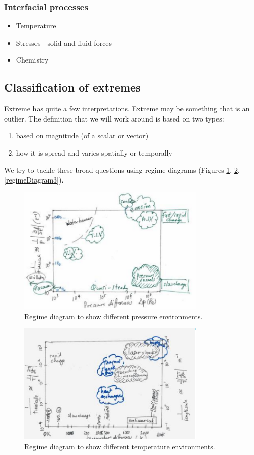 \subsubsection{Interfacial processes}
\begin{itemize}
    \item Temperature
    \item Stresses - solid and fluid forces
    \item Chemistry
\end{itemize}
\subsection{Classification of extremes}
Extreme has quite a few interpretations. Extreme may be something that is an outlier. The definition that we will work around is based on two types:
\begin{enumerate}
    \item based on magnitude (of a scalar or vector)
    \item how it is spread and varies spatially or temporally
\end{enumerate}
We try to tackle these broad questions using regime diagrams (Figures \ref{regimeDiagram1}, \ref{regimeDiagram2}, \ref{regimeDiagram3}).
\begin{figure}[htbp]
    \centering
    \includegraphics[width = 0.8\textwidth]{./img/figure78.png}
    \caption{Regime diagram to show different pressure environments.}
    \label{regimeDiagram1}
\end{figure}
\begin{figure}[htbp]
    \centering
    \includegraphics[width = 0.8\textwidth]{./img/figure79.png}
    \caption{Regime diagram to show different temperature environments.}
    \label{regimeDiagram2}
\end{figure}
